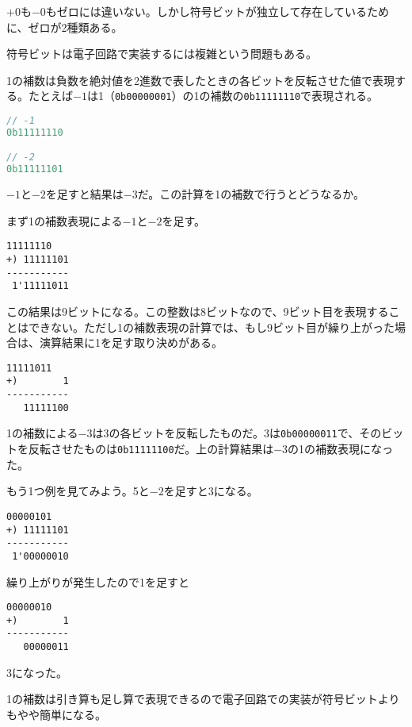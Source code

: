 \(+0\)も\(-0\)もゼロには違いない。しかし符号ビットが独立して存在しているために、ゼロが2種類ある。

符号ビットは電子回路で実装するには複雑という問題もある。


1の補数は負数を絶対値を2進数で表したときの各ビットを反転させた値で表現する。たとえば\(-1\)は1（\texttt{0b00000001}）の1の補数の\texttt{0b11111110}で表現される。

\begin{lstlisting}[language={C++}]
// -1
0b11111110

// -2
0b11111101
\end{lstlisting}

\(-1\)と\(-2\)を足すと結果は\(-3\)だ。この計算を1の補数で行うとどうなるか。

まず1の補数表現による\(-1\)と\(-2\)を足す。

\begin{lstlisting}[style=terminal]
   11111110
+) 11111101
-----------
 1'11111011
\end{lstlisting}

この結果は9ビットになる。この整数は8ビットなので、9ビット目を表現することはできない。ただし1の補数表現の計算では、もし9ビット目が繰り上がった場合は、演算結果に1を足す取り決めがある。

\begin{lstlisting}[style=terminal]
   11111011
+)        1
-----------
   11111100
\end{lstlisting}

1の補数による\(-3\)は3の各ビットを反転したものだ。3は\texttt{0b00000011}で、そのビットを反転させたものは\texttt{0b11111100}だ。上の計算結果は\(-3\)の1の補数表現になった。

もう1つ例を見てみよう。5と\(-2\)を足すと3になる。

\begin{lstlisting}[style=terminal]
   00000101
+) 11111101
-----------
 1'00000010
\end{lstlisting}

繰り上がりが発生したので1を足すと
\begin{lstlisting}[style=terminal]
   00000010
+)        1
-----------
   00000011
\end{lstlisting}
3になった。

1の補数は引き算も足し算で表現できるので電子回路での実装が符号ビットよりもやや簡単になる。

